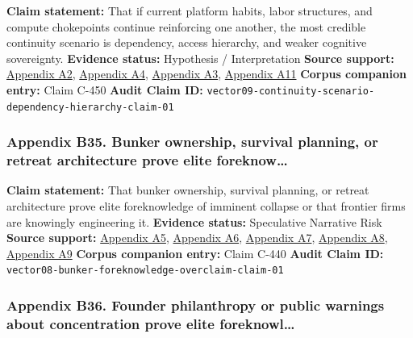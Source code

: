 \documentclass[
  american,
  11pt,
  letterpaper,
]{article}
\begin{document}
\textbf{Claim statement:} That if current platform habits, labor
structures, and compute chokepoints continue reinforcing one another,
the most credible continuity scenario is dependency, access hierarchy,
and weaker cognitive sovereignty. \textbf{Evidence status:} Hypothesis /
Interpretation \textbf{Source support:}
\hyperref[appendix-a2-gpts-are-gpts-an-early-look-at-the-labor-market-impact-potential-of-large-language-models]{Appendix
A2},
\hyperref[appendix-a4-gen-ai-artificial-intelligence-and-the-future-of-work]{Appendix
A4},
\hyperref[appendix-a3-computing-power-and-the-governance-of-artificial-intelligence]{Appendix
A3}, \hyperref[appendix-a11-the-adolescence-of-technology]{Appendix A11}
\textbf{Corpus companion entry:} Claim C-450 \textbf{Audit Claim ID:}
\texttt{vector09-continuity-scenario-dependency-hierarchy-claim-01}

\subsubsection{Appendix B35. Bunker ownership, survival planning, or
retreat architecture prove elite
foreknow\ldots{}}\label{appendix-b35-bunker-ownership-survival-planning-or-retreat-architecture-prove-elite-foreknow}

\textbf{Claim statement:} That bunker ownership, survival planning, or
retreat architecture prove elite foreknowledge of imminent collapse or
that frontier firms are knowingly engineering it. \textbf{Evidence
status:} Speculative Narrative Risk \textbf{Source support:}
\hyperref[appendix-a5-sam-altman-s-manifest-destiny]{Appendix A5},
\hyperref[appendix-a6-inside-mark-zuckerbergs-top-secret-hawaii-compound]{Appendix
A6},
\hyperref[appendix-a7-mark-zuckerberg-downplays-his-5-000-square-foot-underground-bunker-in-hawaii-just-a-little-shelter]{Appendix
A7},
\hyperref[appendix-a8-why-silicon-valley-billionaires-are-prepping-for-the-apocalypse-in-new-zealand]{Appendix
A8},
\hyperref[appendix-a9-new-zealand-woos-the-wealthy-with-golden-visa-changes]{Appendix
A9} \textbf{Corpus companion entry:} Claim C-440 \textbf{Audit Claim
ID:} \texttt{vector08-bunker-foreknowledge-overclaim-claim-01}

\subsubsection{Appendix B36. Founder philanthropy or public warnings
about concentration prove elite
foreknowl\ldots{}}\label{appendix-b36-founder-philanthropy-or-public-warnings-about-concentration-prove-elite-foreknowl}
\end{document}
